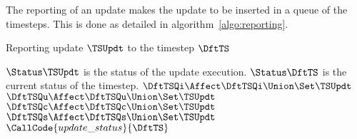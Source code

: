 The reporting of an update makes the update to be inserted in a queue of the timesteps. This is done as detailed in algorithm~\ref{algo:reporting}.


\begin{algorithm}
  \caption{Reporting update $\TSUpdt$ to the timestep $\DftTS$\label{algo:reporting}}
  \begin{algorithmic}[1]
    \REQUIRE $\Status\TSUpdt$ is the status of the update execution.
    \REQUIRE $\Status\DftTS$ is the current status of the timestep.
    \IF    {$\Status\TSUpdt = \Impossible$} \STATE $\DftTSQi \Affect \DftTSQi \Union \Set\TSUpdt$
    \ELSIF {$\Status\TSUpdt = \Updated$}    \STATE $\DftTSQu \Affect \DftTSQu \Union \Set\TSUpdt$
    \ELSIF {$\Status\TSUpdt = \Done$}       \STATE {}
    \ELSIF {$\Status\TSUpdt = \UpToDate$}
    \STATE $\DftTSQc \Affect \DftTSQc \Union \Set\TSUpdt$
    \ELSE
    \STATE $\DftTSQs \Affect \DftTSQs \Union \Set\TSUpdt$
    \ENDIF
    \ENDIF
    \STATE $\CallCode{update\_status}{\DftTS}$ 
  \end{algorithmic}
\end{algorithm}

